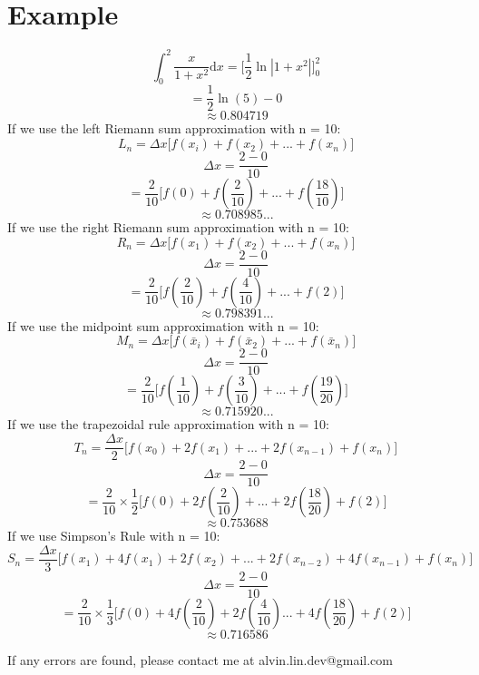 \documentclass[letterpaper, 12pt]{article}
\newcommand*{\diff}{\mathrm{d}}
\begin{document}
\section*{Example}
\[ \int_{0}^{2}{\frac{x}{1+x^{2}}\diff{x}} =
   \bigg[\frac{1}{2}\ln|1+x^{2}|\bigg]_{0}^{2} \]
\[ = \frac{1}{2}\ln(5)-0 \]
\[ \approx 0.804719 \]
If we use the left Riemann sum approximation with n = 10:
\[ L_{n} = \Delta x\bigg[f(x_{i})+f(x_{2})+...+f(x_{n})\bigg] \]
\[ \Delta x = \frac{2-0}{10} \]
\[ = \frac{2}{10}\bigg[f(0)+f(\frac{2}{10})+...+f(\frac{18}{10})\bigg] \]
\[ \approx 0.708985... \]
If we use the right Riemann sum approximation with n = 10:
\[ R_{n} = \Delta x\bigg[f(x_{1})+f(x_{2})+...+f(x_{n})\bigg] \]
\[ \Delta x = \frac{2-0}{10} \]
\[ = \frac{2}{10}\bigg[f(\frac{2}{10})+f(\frac{4}{10})+...+f(2)\bigg] \]
\[ \approx 0.798391... \]
If we use the midpoint sum approximation with n = 10:
\[ M_{n} = \Delta x\bigg[
   f(\bar{x}_{i})+f(\bar{x}_{2})+...+f(\bar{x}_{n})\bigg] \]
\[ \Delta x = \frac{2-0}{10} \]
\[ = \frac{2}{10}\bigg[
   f(\frac{1}{10})+f(\frac{3}{10})+...+f(\frac{19}{20})\bigg] \]
\[ \approx 0.715920... \]
If we use the trapezoidal rule approximation with n = 10:
\[ T_{n} = \frac{\Delta x}{2}\bigg[
   f(x_{0})+2f(x_{1})+...+2f(x_{n-1})+f(x_{n})\bigg] \]
\[ \Delta x = \frac{2-0}{10} \]
\[ = \frac{2}{10}\times\frac{1}{2}\bigg[
   f(0)+2f(\frac{2}{10})+...+2f(\frac{18}{20})+f(2)\bigg] \]
\[ \approx 0.753688 \]
If we use Simpson's Rule with n = 10:
\[ S_{n} = \frac{\Delta x}{3}\bigg[
   f(x_{1})+4f(x_{1})+2f(x_{2})+...+2f(x_{n-2})+4f(x_{n-1})+f(x_{n})\bigg] \]
\[ \Delta x = \frac{2-0}{10} \]
\[ = \frac{2}{10}\times\frac{1}{3}\bigg[
   f(0)+4f(\frac{2}{10})+2f(\frac{4}{10})...+4f(\frac{18}{20})+f(2)\bigg] \]
\[ \approx 0.716586 \]

\begin{center}
  If any errors are found, please contact me at alvin.lin.dev@gmail.com
\end{center}
\end{document}

